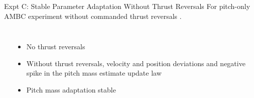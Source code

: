 \begin{frame}{Expt C: Stable Parameter Adaptation Without Thrust Reversals}
  For pitch-only AMBC experiment \alert<2-3>{without commanded thrust
    reversals} .

\begin{columns}
 
      \begin{center}
      \end{center}    

    
      \begin{itemize}
      \item<2->\alert<2>{No thrust reversals}
      \item<3->Without thrust reversals, velocity and position
        deviations and negative spike in the pitch mass estimate
        update law 
       \item<4->Pitch mass adaptation stable
      \end{itemize} 
    

\end{columns}
\end{frame}
